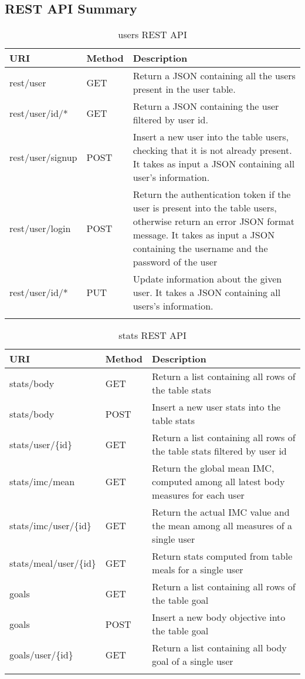 \subsection{REST API Summary}

\renewcommand{\arraystretch}{1.5}

\begin{longtable}{|p{}|p{} |p{}|} 
\hline
\textbf{URI} & \textbf{Method} & \textbf{Description} \\\hline

rest/user & GET & Return a JSON containing all the users present in the user table.\\\hline
rest/user/id/* & GET & Return a JSON containing the user filtered by user id.\\\hline
rest/user/signup & POST & Insert a new user into the table users, checking that it is not already present. It takes as input a JSON containing all user's information.\\\hline
rest/user/login & POST & Return the authentication token if the user is present into the table users, otherwise return an error JSON format message. It takes as input a JSON containing the username and the password of the user\\\hline
rest/user/id/* & PUT & Update information about the given user. It takes a JSON containing all users's information.\\\hline
\caption{users REST API}
\label{tab:termGlossary}
\end{longtable}

\begin{longtable}{|p{}|p{} |p{}|} 
\hline
\textbf{URI} & \textbf{Method} & \textbf{Description} \\\hline

stats/body & GET & Return a list containing all rows of the table stats\\\hline
stats/body & POST & Insert a new user stats into the table stats\\\hline
stats/user/\{id\} & GET & Return a list containing all rows of the table stats filtered by user id\\\hline
stats/imc/mean & GET & Return the global mean IMC, computed among all latest body measures for each user\\\hline
stats/imc/user/\{id\} & GET & Return the actual IMC value and the mean among all measures of a single user\\\hline
stats/meal/user/\{id\} & GET & Return stats computed from table meals for a single user\\\hline
goals & GET & Return a list containing all rows of the table goal\\\hline
goals & POST & Insert a new body objective into the table goal\\\hline
goals/user/\{id\} & GET & Return a list containing all body goal of a single user\\\hline

\caption{stats REST API}
\label{tab:termGlossary}
\end{longtable}

